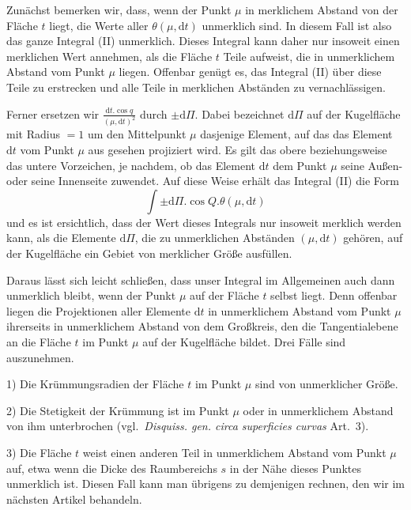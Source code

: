Zunächst bemerken wir, dass, wenn der Punkt $\mu$ in merklichem Abstand von der Fläche $t$ liegt, die Werte aller $\theta(\mu,\mathrm{d}t)$ unmerklich sind. In diesem Fall ist also das ganze Integral (II) unmerklich. Dieses Integral kann daher nur insoweit einen merklichen Wert annehmen, als die Fläche $t$ Teile aufweist, die in unmerklichem Abstand vom Punkt $\mu$ liegen. Offenbar genügt es, das Integral (II) über diese Teile zu erstrecken und alle Teile in merklichen Abständen zu vernachlässigen.

Ferner ersetzen wir $\frac{\mathrm{d}t.\cos q}{(\mu,\mathrm{d}t)^2}$ durch $\pm\mathrm{d}\Pi$. Dabei bezeichnet $\mathrm{d}\Pi$ auf der Kugelfläche mit Radius $=1$ um den Mittelpunkt $\mu$ dasjenige Element, auf das das Element $\mathrm{d}t$ vom Punkt $\mu$ aus gesehen projiziert wird. Es gilt das obere beziehungsweise das untere Vorzeichen, je nachdem, ob das Element $\mathrm{d}t$ dem Punkt $\mu$ seine Außen- oder seine Innenseite zuwendet. Auf diese Weise erhält das Integral (II) die Form
\[
\int\pm\mathrm{d}\Pi.\cos Q.\theta(\mu,\mathrm{d}t)
\]
und es ist ersichtlich, dass der Wert dieses Integrals nur insoweit merklich werden kann, als die Elemente $\mathrm{d}\Pi$, die zu unmerklichen Abständen $(\mu,\mathrm{d}t)$ gehören, auf der Kugelfläche ein Gebiet von merklicher Größe ausfüllen.

Daraus lässt sich leicht schließen, dass unser Integral im Allgemeinen auch dann unmerklich bleibt, wenn der Punkt $\mu$ auf der Fläche $t$ selbst liegt. Denn offenbar liegen die Projektionen aller Elemente $\mathrm{d}t$ in unmerklichem Abstand vom Punkt $\mu$ ihrerseits in unmerklichem Abstand von dem Großkreis, den die Tangentialebene an die Fläche $t$ im Punkt $\mu$ auf der Kugelfläche bildet. Drei Fälle sind auszunehmen.

1) Die Krümmungsradien der Fläche $t$ im Punkt $\mu$ sind von unmerklicher Größe.

2) Die Stetigkeit der Krümmung ist im Punkt $\mu$ oder in unmerklichem Abstand von ihm unterbrochen (vgl.\ \textit{Disquiss. gen. circa superficies curvas} Art.\ 3).

3) Die Fläche $t$ weist einen anderen Teil in unmerklichem Abstand vom Punkt $\mu$ auf, etwa wenn die Dicke des Raumbereichs $s$ in der Nähe dieses Punktes unmerklich ist. Diesen Fall kann man übrigens zu demjenigen rechnen, den wir im nächsten Artikel behandeln.


